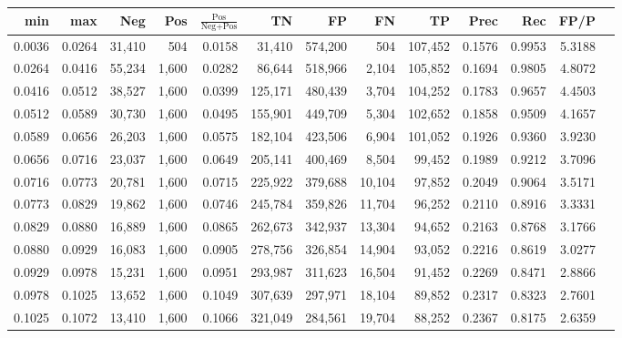 \begin{tabular}{rrrrrrrrrrrrr}
\toprule
   min &    max &    Neg &   Pos & $\frac{\text{Pos}}{\text{Neg}+\text{Pos}}$ &      TN &      FP &      FN &      TP &   Prec &    Rec &   FP/P \\
\midrule
0.0036 & 0.0264 & 31,410 &   504 &                                     0.0158 &  31,410 & 574,200 &     504 & 107,452 & 0.1576 & 0.9953 & 5.3188 \\
0.0264 & 0.0416 & 55,234 & 1,600 &                                     0.0282 &  86,644 & 518,966 &   2,104 & 105,852 & 0.1694 & 0.9805 & 4.8072 \\
0.0416 & 0.0512 & 38,527 & 1,600 &                                     0.0399 & 125,171 & 480,439 &   3,704 & 104,252 & 0.1783 & 0.9657 & 4.4503 \\
0.0512 & 0.0589 & 30,730 & 1,600 &                                     0.0495 & 155,901 & 449,709 &   5,304 & 102,652 & 0.1858 & 0.9509 & 4.1657 \\
0.0589 & 0.0656 & 26,203 & 1,600 &                                     0.0575 & 182,104 & 423,506 &   6,904 & 101,052 & 0.1926 & 0.9360 & 3.9230 \\
0.0656 & 0.0716 & 23,037 & 1,600 &                                     0.0649 & 205,141 & 400,469 &   8,504 &  99,452 & 0.1989 & 0.9212 & 3.7096 \\
0.0716 & 0.0773 & 20,781 & 1,600 &                                     0.0715 & 225,922 & 379,688 &  10,104 &  97,852 & 0.2049 & 0.9064 & 3.5171 \\
0.0773 & 0.0829 & 19,862 & 1,600 &                                     0.0746 & 245,784 & 359,826 &  11,704 &  96,252 & 0.2110 & 0.8916 & 3.3331 \\
0.0829 & 0.0880 & 16,889 & 1,600 &                                     0.0865 & 262,673 & 342,937 &  13,304 &  94,652 & 0.2163 & 0.8768 & 3.1766 \\
0.0880 & 0.0929 & 16,083 & 1,600 &                                     0.0905 & 278,756 & 326,854 &  14,904 &  93,052 & 0.2216 & 0.8619 & 3.0277 \\
0.0929 & 0.0978 & 15,231 & 1,600 &                                     0.0951 & 293,987 & 311,623 &  16,504 &  91,452 & 0.2269 & 0.8471 & 2.8866 \\
0.0978 & 0.1025 & 13,652 & 1,600 &                                     0.1049 & 307,639 & 297,971 &  18,104 &  89,852 & 0.2317 & 0.8323 & 2.7601 \\
0.1025 & 0.1072 & 13,410 & 1,600 &                                     0.1066 & 321,049 & 284,561 &  19,704 &  88,252 & 0.2367 & 0.8175 & 2.6359 \\

\end{tabular}
